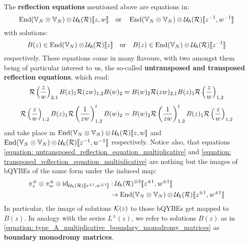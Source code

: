         The \textbf{reflection equations} mentioned above are equations in:
            $$\End( \bbV_N \tensor \bbV_N ) \tensor \calU_{\hbar}(\calR)[\![z, w]\!] \quad \text{or} \quad \End( \bbV_N \tensor \bbV_N ) \tensor \calU_{\hbar}(\calR)[\![z^{-1}, w^{-1}]\!]$$
        with solutions:
            \begin{equation} \label{equation: type_A_multiplicative_boundary_monodromy_matrices}
                B(z) \in \End(\bbV_N) \tensor \calU_{\hbar}(\calR)[\![z]\!] \quad \text{or} \quad B(z) \in \End(\bbV_N) \tensor \calU_{\hbar}(\calR)[\![z^{-1}]\!]
            \end{equation}
        respectively. These equations come in many flavours, with two amongst them being of particular interest to us, the so-called \textbf{untransposed and transposed reflection equations}, which read:
            \begin{equation} \label{equation: untransposed_reflection_equation_multiplicative}
                \mathcal{R}\left(\frac{z}{w}\right)_{2, 1} B(z)_1 \mathcal{R}(zw)_{1, 2} B(w)_2 = B(w)_2 \mathcal{R}(zw)_{2, 1} B(z)_1 \mathcal{R}\left(\frac{z}{w}\right)_{1, 2}
            \end{equation}
            \begin{equation} \label{equation: transposed_reflection_equation_multiplicative}
                \mathcal{R}\left(\frac{z}{w}\right)_{1, 2} B(z)_1 \mathcal{R}\left(\frac{1}{zw}\right)_{1, 2}^t B(w)_2 = B(w)_2 \mathcal{R}\left(\frac{1}{zw}\right)_{1, 2}^t B(z)_1 \mathcal{R}\left(\frac{z}{w}\right)_{1, 2}
            \end{equation}
        and take place in $\End( \bbV_N \tensor \bbV_N ) \tensor \calU_{\hbar}(\calR)[\![z, w]\!]$ and $\End( \bbV_N \tensor \bbV_N ) \tensor \calU_{\hbar}(\calR)[\![z^{-1}, w^{-1}]\!]$ respectively. Notice also, that equations \eqref{equation: untransposed_reflection_equation_multiplicative} and \eqref{equation: transposed_reflection_equation_multiplicative} are nothing but the images of bQYBEs of the same form under the induced map:
            $$
                \begin{aligned}
                    \pi_z^{\pm} \tensor \pi_w^{\pm} \tensor \id_{\calU_{\hbar}(\calR)[\![z^{\pm 1}, w^{\pm 1}]\!]} & : \calU_{\hbar}(\calR)^{\tensor 3}[\![z^{\pm 1}, w^{\pm 1}]\!]
                    \\
                    & \to \End( \bbV_N \tensor \bbV_N ) \tensor \calU_{\hbar}(\calR)[\![z^{\pm 1}, w^{\pm 1}]\!]
                \end{aligned}
            $$
        In particular, the image of solutions $\mathcal{K}(z)$ to those bQYBEs get mapped to $B(z)$. In analogy with the series $L^{\pm}(z)$, we refer to solutions $B(z)$ as in \eqref{equation: type_A_multiplicative_boundary_monodromy_matrices} as \textbf{boundary monodromy matrices}.

